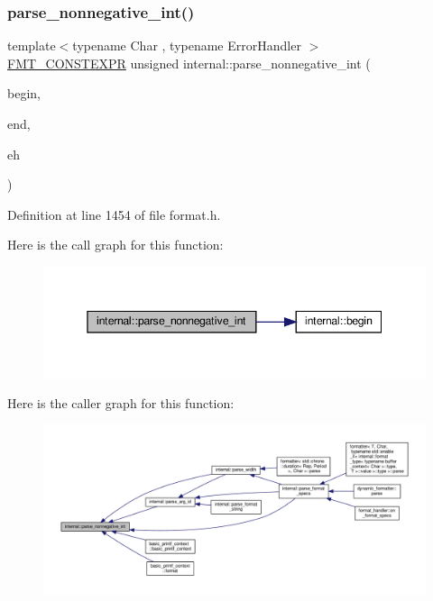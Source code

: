 \subsubsection{\texorpdfstring{parse\+\_\+nonnegative\+\_\+int()}{parse\_nonnegative\_int()}\hspace{0.1cm}{\footnotesize\ttfamily [2/2]}}
{\footnotesize\ttfamily template$<$typename Char , typename Error\+Handler $>$ \\
\hyperlink{core_8h_a69201cb276383873487bf68b4ef8b4cd}{F\+M\+T\+\_\+\+C\+O\+N\+S\+T\+E\+X\+PR} unsigned internal\+::parse\+\_\+nonnegative\+\_\+int (\begin{DoxyParamCaption}\item[{const Char $\ast$\&}]{begin,  }\item[{const Char $\ast$}]{end,  }\item[{Error\+Handler \&\&}]{eh }\end{DoxyParamCaption})}



Definition at line 1454 of file format.\+h.

Here is the call graph for this function\+:
\nopagebreak
\begin{figure}[H]
\begin{center}
\leavevmode
\includegraphics[width=345pt]{namespaceinternal_af621000934cb16d73595619aebb0a35a_cgraph}
\end{center}
\end{figure}
Here is the caller graph for this function\+:
\nopagebreak
\begin{figure}[H]
\begin{center}
\leavevmode
\includegraphics[width=350pt]{namespaceinternal_af621000934cb16d73595619aebb0a35a_icgraph}
\end{center}
\end{figure}
\mbox{\label{namespaceinternal_aa5e9c93ad05ebd920505acdd2122ede6}} 
